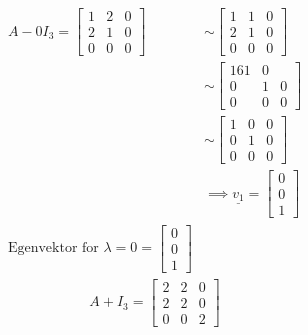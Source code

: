 \documentclass[11pt, a4paper, norsk]{NTNUoving}
\begin{document}
\begin{oppgave}
\begin{punkt}
            \begin{align*}
                A - 0I_3 = \begin{bmatrix}
                    1 & 2 & 0 \\
                    2 & 1 & 0 \\
                    0 & 0 & 0
                \end{bmatrix} &\sim \begin{bmatrix}
                1 & 1 & 0 \\
                2 & 1 & 0 \\
                0 & 0 & 0
                \end{bmatrix}
                \\
                &\sim \begin{bmatrix}
                    1 6 1 & 0 \\
                    0 & 1 & 0 \\
                    0 & 0 & 0 
                \end{bmatrix}
                \\
                &\sim \begin{bmatrix}
                    1 & 0 & 0 \\
                    0 & 1 & 0 \\
                    0 & 0 & 0
                \end{bmatrix}
                \\
                &\implies \underline{v_1} = \begin{bmatrix}
                    0 \\
                    0 \\
                    1
                \end{bmatrix}
                \\
                \text{Egenvektor for } \lambda = 0 = \begin{bmatrix}
                    0 \\
                    0 \\
                    1
                \end{bmatrix}
            \end{align*}
            \begin{align*}
                A + I_{3} = \begin{bmatrix}
                    2 & 2 & 0 \\
                    2 & 2 & 0 \\
                    0 & 0 & 2

\end{bmatrix}
\end{align*}
\end{punkt}
\end{oppgave}
\end{document}
